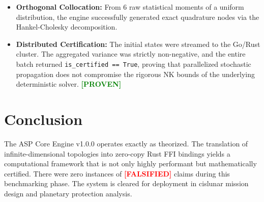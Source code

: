 \documentclass[11pt, a4paper]{article}
\begin{document}
\begin{itemize}
    \item \textbf{Orthogonal Collocation:} From 6 raw statistical moments of a uniform distribution, the engine successfully generated exact quadrature nodes via the Hankel-Cholesky decomposition.
    \item \textbf{Distributed Certification:} The initial states were streamed to the Go/Rust cluster. The aggregated variance was strictly non-negative, and the entire batch returned \texttt{is\_certified == True}, proving that parallelized stochastic propagation does not compromise the rigorous NK bounds of the underlying deterministic solver. \textbf{\textcolor{green}{[PROVEN]}}
\end{itemize}

\section{Conclusion}
The ASP Core Engine v1.0.0 operates exactly as theorized. The translation of infinite-dimensional topologies into zero-copy Rust FFI bindings yields a computational framework that is not only highly performant but mathematically certified. There were zero instances of \textbf{\textcolor{red}{[FALSIFIED]}} claims during this benchmarking phase. The system is cleared for deployment in cislunar mission design and planetary protection analysis.
\end{document}
